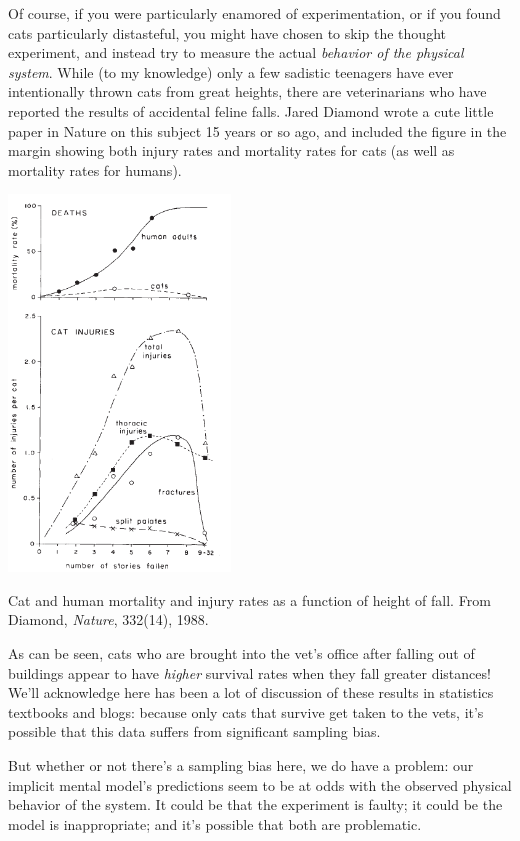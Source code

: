 Of course, if you were particularly enamored of experimentation, or if you found cats particularly distasteful, you might have chosen to skip the thought experiment, and instead try to measure the actual {\it behavior of the physical system}.  While (to my knowledge) only a few sadistic teenagers have ever intentionally thrown cats from great heights, there are veterinarians who have reported the results of accidental feline falls.  Jared Diamond wrote a cute little paper in Nature on this subject 15 years or so ago, and included the figure in the margin showing both injury rates and mortality rates for cats (as well as mortality rates for humans). 
\begin{marginfigure}
\includegraphics[height=10cm]{figs/DiamondFigure}

\caption{Cat and human mortality and injury rates as a function of height of fall.  From Diamond, {\it Nature}, 332(14), 1988.}
\end{marginfigure}

As can be seen, cats who are brought into the vet's office after falling out of buildings appear to have {\it higher} survival rates when they fall greater distances!  We'll acknowledge here has been a lot of discussion of these results in statistics textbooks and blogs: because only cats that survive get taken to the vets, it's possible that this data suffers from significant sampling bias.  

But whether or not there's a sampling bias here, we do have a problem:  our implicit mental model's predictions seem to be at odds with the observed physical behavior of the system.  It could be that the experiment is faulty; it could be the model is inappropriate; and it's possible that both are problematic.  

